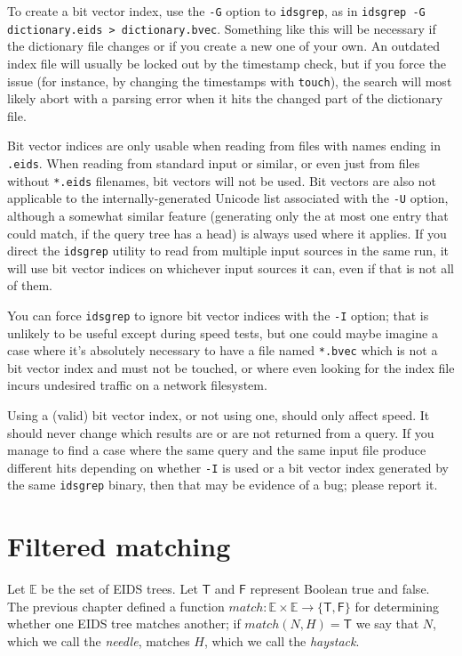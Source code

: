 \documentclass[twocolumn]{report}
\newcommand{\DangerousSection}{\marginpar{\large\hfill
\raisebox{-0.5\baselineskip}[0pt][0pt]{\dbend}\hfill\null}}
\begin{document}
To create a bit vector index, use the \texttt{-G} option to
\texttt{idsgrep}, as in \texttt{idsgrep -G dictionary.eids >
dictionary.bvec}.  Something like this will be necessary if the dictionary
file changes or if you create a new one of your own.  An outdated index file
will usually be locked out by the timestamp check, but if you force the
issue (for instance, by changing the timestamps with \texttt{touch}), the
search will most likely abort with a parsing error when it hits the changed
part of the dictionary file.

Bit vector indices are only usable when reading from files with names ending
in \texttt{.eids}.  When reading from standard input or similar, or even
just from files without \texttt{*.eids} filenames, bit vectors will not be
used.  Bit vectors are also not applicable to the internally-generated
Unicode list associated with the \texttt{-U} option, although a somewhat
similar feature (generating only the at most one entry that could match, if
the query tree has a head) is always used where it applies.  If you direct
the \texttt{idsgrep} utility to read from multiple input sources in the same
run, it will use bit vector indices on whichever input sources it can, even
if that is not all of them.

You can force \texttt{idsgrep} to ignore bit vector indices with the
\texttt{-I} option; that is unlikely to be useful except during speed tests,
but one could maybe imagine a case where it's absolutely necessary to have a
file named \texttt{*.bvec} which is not a bit vector index and must not be
touched, or where even looking for the index file incurs undesired traffic
on a network filesystem.

Using a (valid) bit vector index, or not using one, should only affect
speed.  It should never change which results are or are not returned from a
query.  If you manage to find a case where the same query and the same input
file produce different hits depending on whether \texttt{-I} is used or a
bit vector index generated by the same \texttt{idsgrep} binary, then that
may be evidence of a bug; please report it.


\section{Filtered matching}\DangerousSection

Let $\mathbb{E}$ be the set of EIDS trees.  Let $\mathsf{T}$
and $\mathsf{F}$ represent Boolean true and false.  The previous chapter
defined a function $\mathit{match}:\mathbb{E}\times\mathbb{E}\rightarrow
\{\mathsf{T},\mathsf{F}\}$ for determining whether one EIDS tree matches
another; if $\mathit{match}(N,H)=\mathsf{T}$ we say that $N$, which we call
the \emph{needle}, matches $H$, which we call the \emph{haystack}.
\end{document}
